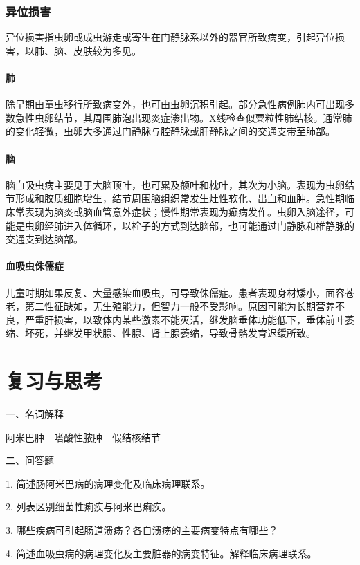\subsubsection{异位损害}

异位损害指虫卵或成虫游走或寄生在门静脉系以外的器官所致病变，引起异位损害，以肺、脑、皮肤较为多见。

\paragraph{肺}
除早期由童虫移行所致病变外，也可由虫卵沉积引起。部分急性病例肺内可出现多数急性虫卵结节，其周围肺泡出现炎症渗出物。X线检查似粟粒性肺结核。通常肺的变化轻微，虫卵大多通过门静脉与腔静脉或肝静脉之间的交通支带至肺部。

\paragraph{脑}
脑血吸虫病主要见于大脑顶叶，也可累及额叶和枕叶，其次为小脑。表现为虫卵结节形成和胶质细胞增生，结节周围脑组织常发生灶性软化、出血和血肿。急性期临床常表现为脑炎或脑血管意外症状；慢性期常表现为癫病发作。虫卵入脑途径，可能是虫卵经肺进入体循环，以栓子的方式到达脑部，也可能通过门静脉和椎静脉的交通支到达脑部。

\paragraph{血吸虫侏儒症}
儿童时期如果反复、大量感染血吸虫，可导致侏儒症。患者表现身材矮小，面容苍老，第二性征缺如，无生殖能力，但智力一般不受影响。原因可能为长期营养不良，严重肝损害，以致体内某些激素不能灭活，继发脑垂体功能低下，垂体前叶萎缩、坏死，并继发甲状腺、性腺、肾上腺萎缩，导致骨骼发育迟缓所致。

\section*{复习与思考}

{一、名词解释}

阿米巴肿　嗜酸性脓肿　假结核结节

{二、问答题}

1. 简述肠阿米巴病的病理变化及临床病理联系。

2. 列表区别细菌性痢疾与阿米巴痢疾。

3. 哪些疾病可引起肠道溃疡？各自溃疡的主要病变特点有哪些？

4. 简述血吸虫病的病理变化及主要脏器的病变特征。解释临床病理联系。